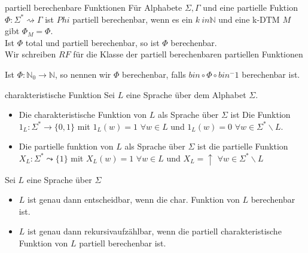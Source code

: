 
\begin{defn}{partiell berechenbare Funktionen}
    Für Alphabete $\Sigma, \Gamma$ und eine partielle Fuktion $\Phi : \Sigma^* \rightsquigarrow 
    \Gamma$ ist $Phi$ partiell berechenbar, wenn es ein $k \ in \mathbb{N}$ und eine k-DTM $M$ gibt $\Phi_M = \Phi$. \\

    Ist $\Phi$ total und partiell berechenbar, so ist $\Phi$ berechenbar. \\

    Wir schreiben $RF$ für die Klasse der partiell berechenbaren partiellen Funktionen

    Ist $\Phi : \mathbb{N}_0 \rightarrow \mathbb{N}$, so nennen wir $\Phi$ berechenbar,
    falls $bin \circ \Phi \circ bin^-1$ berechenbar ist.
\end{defn}

\begin{defn}{charakteristische Funktion}
    Sei $L$ eine Sprache über dem Alphabet $\Sigma$. \\
    \begin{itemize}
        \item Die charakteristische Funktion von $L$ als Sprache über $\Sigma$ ist Die
              Funktion $1_L : \Sigma^* \rightarrow \{0,1\}$ mit $1_L(w) = 1$ $\forall w \in L$
              und $1_L(w) = 0$ $\forall w \in \Sigma^* \backslash L$.
        \item Die partielle funktion von $L$ als Sprache über $\Sigma$ ist die partielle Funktion
              $X_L : \Sigma^* \leadsto \{1\}$ mit $X_L(w) = 1$ $\forall w \in L$ und $X_L = \uparrow$ $\forall w \in \Sigma^* \backslash L$
    \end{itemize}
\end{defn}

\begin{bem}
    Sei $L$ eine Sprache über $\Sigma$\\
    \begin{itemize}
        \item $L$ ist genau dann entscheidbar, wenn die char. Funktion von $L$ berechenbar ist.
        \item $L$ ist genau dann rekursivaufzählbar, wenn die partiell charakteristische Funktion von $L$
              partiell berechenbar ist.
    \end{itemize}
\end{bem}

